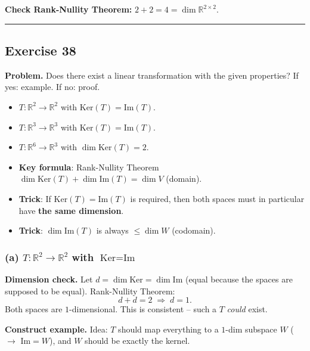 \documentclass[a4paper,12pt]{article}
\begin{document}
\textbf{Check Rank-Nullity Theorem:} $2 + 2 = 4 = \dim \mathbb{R}^{2\times 2}$. \checkmark

\bigskip
\hrule
\bigskip

\subsection*{Exercise 38}

\textbf{Problem.} Does there exist a linear transformation with the given properties? If yes: example. If no: proof.
\begin{itemize}[nosep]
\item[(a)] $T \colon \mathbb{R}^2 \to \mathbb{R}^2$ with $\text{Ker}(T) = \text{Im}(T)$.
\item[(b)] $T \colon \mathbb{R}^3 \to \mathbb{R}^3$ with $\text{Ker}(T) = \text{Im}(T)$.
\item[(c)] $T \colon \mathbb{R}^6 \to \mathbb{R}^3$ with $\dim \text{Ker}(T) = 2$.
\end{itemize}

\begin{begriffe}
\begin{itemize}[leftmargin=*, nosep]
    \item \textbf{Key formula}: Rank-Nullity Theorem $\dim \text{Ker}(T) + \dim \text{Im}(T) = \dim V$ (domain).
    \item \textbf{Trick}: If $\text{Ker}(T) = \text{Im}(T)$ is required, then both spaces must in particular have \textbf{the same dimension}.
    \item \textbf{Trick}: $\dim \text{Im}(T)$ is always $\leq \dim W$ (codomain).
\end{itemize}
\end{begriffe}

\subsubsection*{(a) $T \colon \mathbb{R}^2 \to \mathbb{R}^2$ with $\text{Ker} = \text{Im}$}

\textbf{Dimension check.} Let $d = \dim \text{Ker} = \dim \text{Im}$ (equal because the spaces are supposed to be equal). Rank-Nullity Theorem:
\[
d + d = 2 \;\Rightarrow\; d = 1.
\]
Both spaces are $1$-dimensional. This is consistent -- such a $T$ \emph{could} exist.

\textbf{Construct example.} Idea: $T$ should map everything to a $1$-dim subspace $W$ ($\to$ $\text{Im} = W$), and $W$ should be exactly the kernel.
\end{document}
